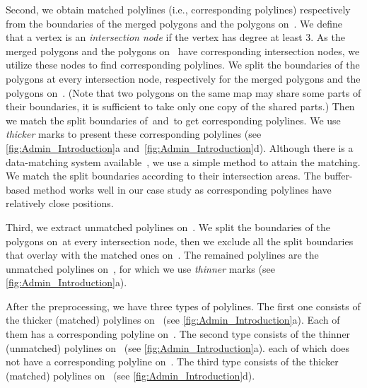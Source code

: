 Second, we obtain matched polylines 
(i.e., corresponding polylines)
respectively from the boundaries of the 
merged polygons and the polygons on~\ms. 
We define that a vertex is an \emph{intersection node} 
if the vertex has degree at least 3. 
As the merged polygons and the polygons on~\ms 
have corresponding intersection nodes, 
we utilize these 
nodes to find corresponding polylines. 
We split the boundaries of the 
polygons at every intersection node, 
respectively for the merged polygons and the 
polygons on~\ms. 
(Note that two polygons on the same map may 
share some parts of their boundaries, 
it is sufficient to take only one copy of the shared parts.) 
Then we match the split boundaries of~\ml and~\ms to get 
corresponding polylines. 
We use \emph{thicker} marks to 
present these corresponding polylines 
(see \figs\ref{fig:Admin_Introduction}a
and~\ref{fig:Admin_Introduction}d). 
Although there is a data-matching 
system available~\parencite[see][]{Mustiere2008}, 
we use a simple method to attain the matching. 
We match the split boundaries 
according to their intersection areas. 
The buffer-based method works well in our case study as 
corresponding polylines have relatively close positions.

Third, we extract unmatched polylines on~\ml. 
We split the boundaries of the polygons 
on~\ml at every intersection node, 
then we exclude all the split boundaries 
that overlay with the matched ones on~\ml. 
The remained polylines are the unmatched polylines on~\ml,
for which we use \emph{thinner} marks
(see \fig\ref{fig:Admin_Introduction}a). 

After the preprocessing, we have three types of polylines. 
The first one consists of 
the thicker (matched) polylines on~\ml
(see \fig\ref{fig:Admin_Introduction}a).
Each of them has a corresponding polyline on~\ms.
%
The second type consists of 
the thinner (unmatched) polylines on~\ml
(see \fig\ref{fig:Admin_Introduction}a).
each of which does not have a
corresponding polyline on~\ms.
%
The third type consists of 
the thicker (matched) polylines on~\ms
(see \fig\ref{fig:Admin_Introduction}d).


